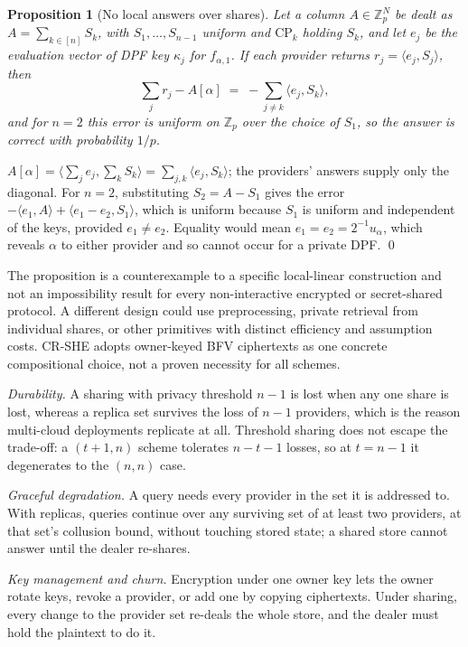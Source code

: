 \documentclass[a4paper,fleqn]{cas-sc}
\newtheorem{proposition}{Proposition}
\begin{document}
\begin{proposition}[No local answers over shares]
\label{prop:nolocal}
Let a column $A\in\mathbb{Z}_p^N$ be dealt as $A=\sum_{k\in[n]}S_k$, with
$S_1,\dots,S_{n-1}$ uniform and $\text{CP}_k$ holding $S_k$, and let $e_j$ be
the evaluation vector of DPF key $\kappa_j$ for $f_{\alpha,1}$. If each
provider returns $r_j=\langle e_j,S_j\rangle$, then
\[
\textstyle\sum_{j} r_j - A[\alpha] \;=\; -\sum_{j\neq k}\langle e_j,S_k\rangle ,
\]
and for $n=2$ this error is uniform on $\mathbb{Z}_p$ over the choice of
$S_1$, so the answer is correct with probability $1/p$.
\end{proposition}
\begin{pf}
$A[\alpha]=\langle\sum_j e_j,\sum_k S_k\rangle=\sum_{j,k}\langle e_j,S_k\rangle$;
the providers' answers supply only the diagonal. For $n=2$, substituting
$S_2=A-S_1$ gives the error $-\langle e_1,A\rangle+\langle e_1-e_2,S_1\rangle$,
which is uniform because $S_1$ is uniform and independent of the keys, provided
$e_1\neq e_2$. Equality would mean $e_1=e_2=2^{-1}u_\alpha$, which reveals
$\alpha$ to either provider and so cannot occur for a private DPF. \qed
\end{pf}

The proposition is a counterexample to a specific
local-linear construction and not an impossibility result for every
non-interactive encrypted or secret-shared protocol.
A different design could use preprocessing, private retrieval from
individual shares, or other primitives with distinct efficiency and
assumption costs. CR-SHE adopts owner-keyed BFV ciphertexts as
one concrete compositional choice, not a proven necessity for all schemes.

\emph{Durability.} A sharing with privacy threshold $n-1$ is lost when any one
share is lost, whereas a replica set survives the loss of $n-1$ providers,
which is the reason multi-cloud deployments replicate at all. Threshold
sharing does not escape the trade-off: a $(t{+}1,n)$ scheme tolerates
$n-t-1$ losses, so at $t=n-1$ it degenerates to the $(n,n)$ case.

\emph{Graceful degradation.} A query needs every provider in the set it is
addressed to. With replicas, queries continue over any surviving set of at
least two providers, at that set's collusion bound, without touching stored
state; a shared store cannot answer until the dealer re-shares.

\emph{Key management and churn.} Encryption under one owner key lets the owner
rotate keys, revoke a provider, or add one by copying ciphertexts. Under
sharing, every change to the provider set re-deals the whole store, and the
dealer must hold the plaintext to do it.
\end{document}
